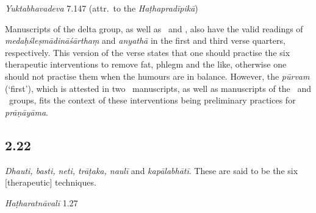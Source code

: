 \begin{ekdosis}
\begin{testimonia}[hp02_021]
\emph{Yuktabhavadeva} 7.147 (attr.~to the \emph{Haṭhapradīpikā})

\begin{versinnote}
\end{versinnote}

\end{testimonia}

\begin{philcomm}[hp02_021]
Manuscripts of the delta group, as well as \etaTwo\ and \epsilonThree, also have the valid readings of \emph{medaḥśleṣmādināśārthaṃ} and \emph{anyathā} in the first and third verse quarters, respectively. This version of the verse states that one should practise the six therapeutic interventions to remove fat, phlegm and the like, otherwise one should not practise them when the humours are in balance. However, the \emph{pūrvam} (`first'), which is attested in two \textalpha\ manuscripts, as well as manuscripts of the \textbeta\ and \textgamma\ groups, fits the context of these interventions being preliminary practices for \emph{prāṇāyāma}.
\end{philcomm}

\subsection*{2.22}
\begin{translation}[hp02_022]
\emph{Dhauti, basti, neti, trāṭaka, naulī} and \emph{kapālabhātī}. These are said to be the six [therapeutic] techniques.%
\end{translation}

\begin{sources}[hp02_022]
\end{sources}

\begin{testimonia}[hp02_022]
\emph{Haṭharatnāvalī} 1.27

\begin{versinnote}
\end{versinnote}


\end{testimonia}
\end{ekdosis}
